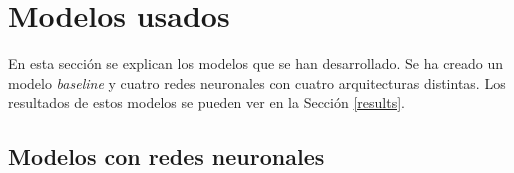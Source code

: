 \section{Modelos usados}

En esta sección se explican los modelos que se han desarrollado. Se ha creado un modelo \textit{baseline} y cuatro redes neuronales con cuatro arquitecturas distintas. Los resultados de estos modelos se pueden ver en la Sección \ref{results}.
\newline


\subsection{Modelos con redes neuronales}






